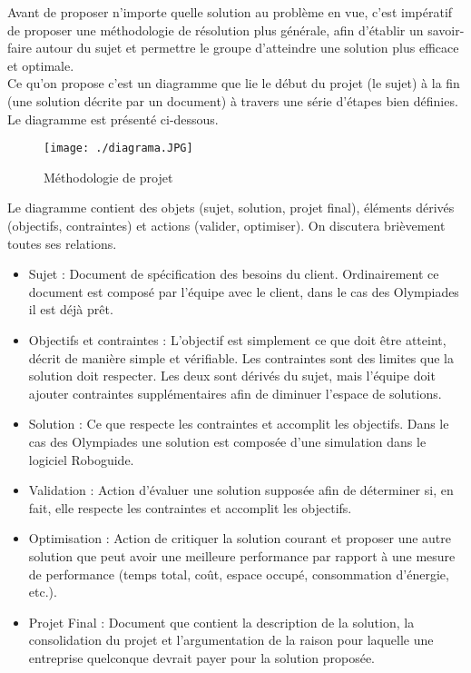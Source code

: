 \pagebreak {}


Avant de proposer n’importe quelle solution au problème en vue, c’est impératif de proposer une méthodologie de résolution plus générale, afin d’établir un savoir-faire autour du sujet et permettre le groupe d’atteindre une solution plus efficace et optimale.\\
Ce qu’on propose c’est un diagramme que lie le début du projet (le sujet) à la fin (une solution décrite par un document) à travers une série d’étapes bien définies. Le diagramme est présenté ci-dessous.\\


\begin{figure}[H]
	\begin{center}	
		\texttt{[image: ./diagrama.JPG]}
		\caption{Méthodologie de projet}
		\label{fig:diagrama}
	\end{center}
\end{figure}



\vspace{20pt}
Le diagramme contient des objets (sujet, solution, projet final), éléments dérivés (objectifs, contraintes) et actions (valider, optimiser). On discutera brièvement toutes ses relations.
\begin{itemize}
	
\item Sujet : Document de spécification des besoins du client. Ordinairement ce document est composé par l’équipe avec le client, dans le cas des Olympiades il est déjà prêt.
\item 	Objectifs et contraintes : L’objectif est simplement ce que doit être atteint, décrit de manière simple et vérifiable. Les contraintes sont des limites que la solution doit respecter. Les deux sont dérivés du sujet, mais l’équipe doit ajouter contraintes supplémentaires afin de diminuer l’espace de solutions.
\item 	Solution : Ce que respecte les contraintes et accomplit les objectifs. Dans le cas des Olympiades une solution est composée d’une simulation dans le logiciel Roboguide.
\item 	Validation : Action d’évaluer une solution supposée afin de déterminer si, en fait, elle respecte les contraintes et accomplit les objectifs.
\item 	Optimisation : Action de critiquer la solution courant et proposer une autre solution que peut avoir une meilleure performance par rapport à une mesure de performance (temps total, coût, espace occupé, consommation d’énergie, etc.). 
\item 	Projet Final : Document que contient la description de la solution, la consolidation du projet et l’argumentation de la raison pour laquelle une entreprise quelconque devrait payer pour la solution proposée.
\end{itemize}

